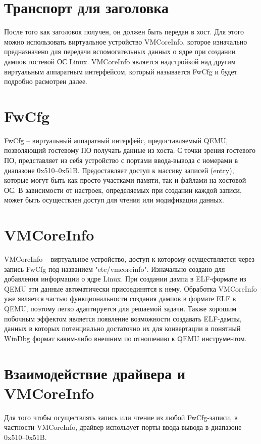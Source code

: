 \documentclass{mipt-thesis-bs}
\begin{document}
\section*{Транспорт для заголовка}

После того как заголовок получен, он должен быть передан в хост. Для этого можно использовать виртуальное устройство VMCoreInfo, которое изначально предназначено для передачи вспомогательных данных о ядре при создании дампов гостевой ОС Linux. VMCoreInfo является надстройкой над другим виртуальным аппаратным интерфейсом, который называется FwCfg и будет подробно расмотрен далее.

\section*{FwCfg}

FwCfg -- виртуальный аппаратный интерфейс, предоставляемый QEMU, позволяющий гостевому ПО получать данные из хоста. С точки зрения гостевого ПО, представляет из себя устройство с портами ввода-вывода с номерами в диапазоне 0x510--0x51B. Предоставляет доступ к массиву записей (entry), которые могут быть как просто участками памяти, так и файлами на хостовой ОС. В зависимости от настроек, определяемых при создании каждой записи, может быть осуществлен доступ для чтения или модификации данных.

\section*{VMCoreInfo}

VMCoreInfo -- виртуальное устройство, доступ к которому осуществляется через запись FwCfg под названием "etc/vmcoreinfo". Изначально создано для добавления информации о ядре Linux. При создании дампа в ELF-формате из QEMU эти данные автоматически присоединятся к нему. Обработка VMCoreInfo уже является частью функциональности создания дампов в формате ELF в QEMU, поэтому легко адаптируется для решаемой задачи. Также хорошим побочным эффектом является появление возможности создавать ELF-дампы, данных в которых потенциально достаточно их для конвертации в понятный WinDbg формат каким-либо внешним по отношению к QEMU инструментом.

\section*{Взаимодействие драйвера и VMCoreInfo}

Для того чтобы осуществлять запись или чтение из любой FwCfg-записи, в частности VMCoreInfo, драйвер использует порты ввода-вывода в диапазоне 0x510--0x51B.
\end{document}
